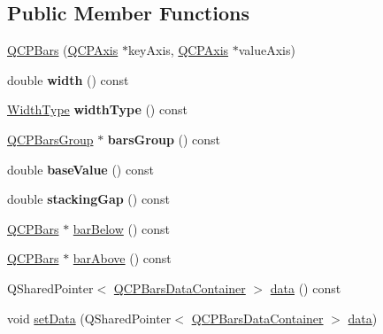 \subsection*{Public Member Functions}
\begin{DoxyCompactItemize}
\item 
\hyperlink{class_q_c_p_bars_a64006999ad9dff308f40df41cef176ad}{Q\+C\+P\+Bars} (\hyperlink{class_q_c_p_axis}{Q\+C\+P\+Axis} $\ast$key\+Axis, \hyperlink{class_q_c_p_axis}{Q\+C\+P\+Axis} $\ast$value\+Axis)
\item 
\mbox{\label{class_q_c_p_bars_abe7eb3987d8711f45829db879aee2280}} 
double {\bfseries width} () const
\item 
\mbox{\label{class_q_c_p_bars_a4c103fb405a45f47853e0345f0c6e708}} 
\hyperlink{class_q_c_p_bars_a65dbbf1ab41cbe993d71521096ed4649}{Width\+Type} {\bfseries width\+Type} () const
\item 
\mbox{\label{class_q_c_p_bars_a5eef59840b68d205df4e0c3df5f97633}} 
\hyperlink{class_q_c_p_bars_group}{Q\+C\+P\+Bars\+Group} $\ast$ {\bfseries bars\+Group} () const
\item 
\mbox{\label{class_q_c_p_bars_a29a7b3b86f80b2a04bd1f9ec0ebaf422}} 
double {\bfseries base\+Value} () const
\item 
\mbox{\label{class_q_c_p_bars_a2e6192fa9c16df7ba94cd50c0c9ec7ce}} 
double {\bfseries stacking\+Gap} () const
\item 
\hyperlink{class_q_c_p_bars}{Q\+C\+P\+Bars} $\ast$ \hyperlink{class_q_c_p_bars_a1b58664864b141f45e02044a855b3213}{bar\+Below} () const
\item 
\hyperlink{class_q_c_p_bars}{Q\+C\+P\+Bars} $\ast$ \hyperlink{class_q_c_p_bars_ab97f2acd9f6cb40d2cc3c33d278f0e78}{bar\+Above} () const
\item 
Q\+Shared\+Pointer$<$ \hyperlink{class_q_c_p_data_container}{Q\+C\+P\+Bars\+Data\+Container} $>$ \hyperlink{class_q_c_p_bars_a7e373a534d82e18ed27b3fafd1f08fae}{data} () const
\item 
void \hyperlink{class_q_c_p_bars_a6dc562ec7120a8521e1061f2134367e4}{set\+Data} (Q\+Shared\+Pointer$<$ \hyperlink{class_q_c_p_data_container}{Q\+C\+P\+Bars\+Data\+Container} $>$ \hyperlink{class_q_c_p_bars_a7e373a534d82e18ed27b3fafd1f08fae}{data})

\end{DoxyCompactItemize}
